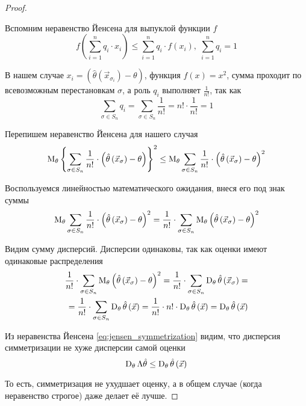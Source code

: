 \begin{proof}
\begin{enumerate}
      Вспомним неравенство Йенсена для выпуклой функции $f$
      \cite[с.~167]{DorogovtsevMA}
      $$f\left(\sum_{i=1}^n q_i \cdot x_i\right)
          \le \sum_{i=1}^n q_i \cdot f\left(x_i\right),\;
        \sum_{i=1}^n q_i=1$$

      В нашем случае
      $x_i= \left(\hat{\theta}
          \left(\vec{x}_{\sigma_i}\right)-\theta\right)$,
      функция $f\left(x\right)=x^2$,
      сумма проходит по всевозможным перестановкам $\sigma$,
      а роль $q_i$ выполняет $\frac{1}{n!}$,
      так как
          $$\sum_{\sigma\in S_n} q_i
        = \sum_{\sigma\in S_n}\frac{1}{n!}=n!\cdot \frac{1}{n!}=1$$

      Перепишем неравенство Йенсена для нашего случая
      \begin{equation}\label{eq:jensen_symmetrization}
          \operatorname{M}_{\theta} \left\{\sum_{\sigma\in S_n}\frac{1}{n!}\cdot
        \left(\hat{\theta}\left(\vec{x}_\sigma\right)
        -\theta\right)\right\}^2
        \le\operatorname{M}_{\theta} \sum_{\sigma\in S_n}\frac{1}{n!}\cdot
            \left(\hat{\theta}\left(\vec{x}_\sigma\right)
            -\theta\right)^2
      \end{equation}

      Воспользуемся линейностью математического ожидания,
      внеся его под знак суммы
      \begin{align*}
          \operatorname{M}_{\theta} \sum_{\sigma\in S_n}\frac{1}{n!}\cdot
        \left(\hat{\theta}\left(\vec{x}_\sigma\right)
        -\theta\right)^2
          = \frac{1}{n!}\cdot \sum_{\sigma\in S_n}
        \operatorname{M}_{\theta} 
            \left(\hat{\theta}\left(\vec{x}_\sigma\right)
            -\theta\right)^2
      \end{align*}

      Видим сумму дисперсий.
      Дисперсии одинаковы, так как оценки имеют одинаковые распределения
      \begin{align*}
          \frac{1}{n!}\cdot \sum_{\sigma\in S_n}
        \operatorname{M}_{\theta} 
            \left(\hat{\theta}\left(\vec{x}_\sigma\right)
            -\theta\right)^2
          = \frac{1}{n!}\cdot \sum_{\sigma\in S_n}
        \operatorname{D}_{\theta} 
            \hat{\theta}\left(\vec{x}_\sigma\right)= \\
          = \frac{1}{n!}\cdot \sum_{\sigma\in S_n}
        \operatorname{D}_{\theta} \hat{\theta}\left(\vec{x}\right)
          = \frac{1}{n!}\cdot n!
        \cdot \operatorname{D}_{\theta} \hat{\theta}\left(\vec{x}\right)
          = \operatorname{D}_{\theta} \hat{\theta}\left(\vec{x}\right)
      \end{align*}

      Из неравенства Йенсена \eqref{eq:jensen_symmetrization} видим,
      что дисперсия симметризации не хуже дисперсии самой оценки
      $$\operatorname{D}_{\theta} \Lambda\hat{\theta}
          \le\operatorname{D}_{\theta} \hat{\theta}\left({\vec{x}}\right)$$

  \end{enumerate}

  То есть, симметризация не ухудшает оценку,
  а в общем случае (когда неравенство строгое) даже делает её лучше.
\end{proof}

